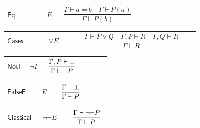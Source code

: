 \documentclass[12pt,reqno]{amsart}
\theoremstyle{blueplain}
\numberwithin{equation}{section}
\begin{document}
{\scriptsize \setlength{\parskip}{0pt}\nointerlineskip
\noindent 
\begin{tabular}{|@{}>{\centering\arraybackslash}m{0.19251\linewidth}|>{\centering\arraybackslash}m{0.16845\linewidth}|>{\centering\arraybackslash}m{0.53904\linewidth}|}
\hline
\hypertarget{rule:Eq}{$\displaystyle \mathsf{Eq}$} & $\displaystyle =E$ & 
\rule[-3.3ex]{0pt}{7.8ex}$\displaystyle \dfrac{\Gamma\vdash
a=b\quad\Gamma\vdash P(a)}{\Gamma\vdash P(b)}$ \\ \hline
\end{tabular}%
}

{\scriptsize \setlength{\parskip}{0pt}\nointerlineskip
\noindent 
\begin{tabular}{|@{}>{\centering\arraybackslash}m{0.19251\linewidth}|>{\centering\arraybackslash}m{0.16845\linewidth}|>{\centering\arraybackslash}m{0.53904\linewidth}|}
\hline
\hypertarget{rule:Cases}{$\displaystyle \mathsf{Cases}$} & $\displaystyle %
\vee E$ & \rule[-3.3ex]{0pt}{7.8ex}$\displaystyle \dfrac{\Gamma\vdash P\lor
Q\quad\Gamma,P\vdash R\quad\Gamma,Q\vdash R}{\Gamma\vdash R}$ \\ \hline
\end{tabular}%
}

{\scriptsize \setlength{\parskip}{0pt}\nointerlineskip
\noindent 
\begin{tabular}{|@{}>{\centering\arraybackslash}m{0.19251\linewidth}|>{\centering\arraybackslash}m{0.16845\linewidth}|>{\centering\arraybackslash}m{0.53904\linewidth}|}
\hline
\hypertarget{rule:NotI}{$\displaystyle \mathsf{NotI}$} & $\displaystyle \neg
I$ & \rule[-3.3ex]{0pt}{7.8ex}$\displaystyle \dfrac{\Gamma,P\vdash\bot}{%
\Gamma\vdash\neg P}$ \\ \hline
\end{tabular}%
}

{\scriptsize \setlength{\parskip}{0pt}\nointerlineskip
\noindent 
\begin{tabular}{|@{}>{\centering\arraybackslash}m{0.19251\linewidth}|>{\centering\arraybackslash}m{0.16845\linewidth}|>{\centering\arraybackslash}m{0.53904\linewidth}|}
\hline
\hypertarget{rule:FalseE}{$\displaystyle \mathsf{FalseE}$} & $\displaystyle %
\bot E$ & \rule[-3.3ex]{0pt}{7.8ex}$\displaystyle \dfrac{\Gamma\vdash\bot}{%
\Gamma\vdash P}$ \\ \hline
\end{tabular}%
}

{\scriptsize \setlength{\parskip}{0pt}\nointerlineskip
\noindent 
\begin{tabular}{|@{}>{\centering\arraybackslash}m{0.19251\linewidth}|>{\centering\arraybackslash}m{0.16845\linewidth}|>{\centering\arraybackslash}m{0.53904\linewidth}|}
\hline
\hypertarget{rule:Classical}{$\displaystyle \mathsf{Classical}$} & $%
\displaystyle \neg\neg E$ & \rule[-3.3ex]{0pt}{7.8ex}$\displaystyle \dfrac{%
\Gamma\vdash\neg\neg P}{\Gamma\vdash P}$ \\ \hline
\end{tabular}%
}
\end{document}
